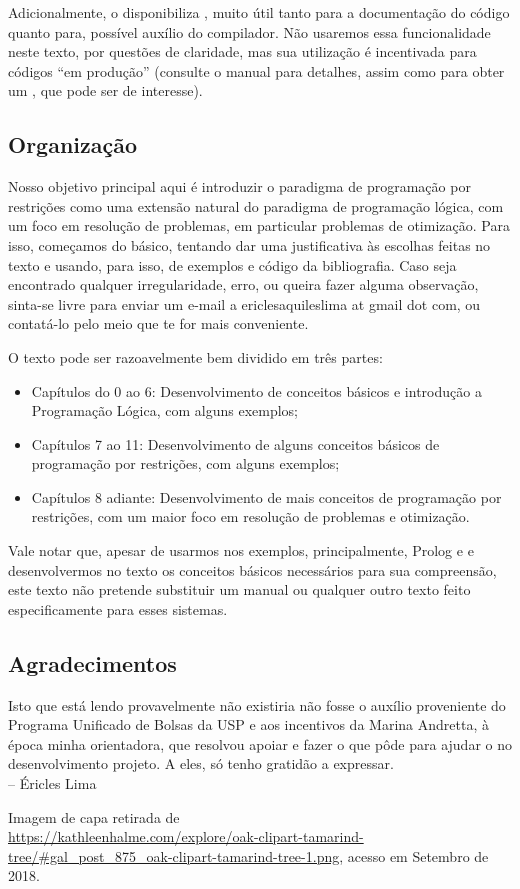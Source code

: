 Adicionalmente, o \eclipse disponibiliza , muito
útil tanto para a documentação do código quanto para, possível auxílio
do compilador. Não usaremos essa funcionalidade neste texto, por
questões de claridade, mas sua utilização é incentivada para códigos
``em produção'' (consulte o manual para detalhes, assim como para
obter um , que pode ser de interesse).


\subsection*{Organização}

Nosso objetivo principal aqui é introduzir o paradigma de programação
por restrições como uma extensão natural do paradigma de programação
lógica, com um foco em resolução de problemas, em particular problemas
de otimização. Para isso, começamos do básico, tentando dar uma
justificativa às escolhas feitas no texto e usando, para isso, de
exemplos e código da bibliografia. Caso seja encontrado qualquer
irregularidade, erro, ou queira fazer alguma observação, sinta-se
livre para enviar um e-mail a ericlesaquileslima at gmail dot com, ou
contatá-lo pelo meio que te for mais conveniente.

O texto pode ser razoavelmente bem dividido em três partes:
\begin{itemize}
\item Capítulos do 0 ao 6: Desenvolvimento de conceitos básicos e
  introdução a Programação Lógica, com alguns exemplos;
\item Capítulos 7 ao 11: Desenvolvimento de alguns conceitos básicos
  de programação por restrições, com alguns exemplos;
\item Capítulos 8 adiante: Desenvolvimento de mais conceitos de
  programação por restrições, com um maior foco em resolução de
  problemas e otimização.
\end{itemize}

Vale notar que, apesar de usarmos nos exemplos, principalmente, Prolog
e \eclipse e desenvolvermos no texto os conceitos básicos necessários
para sua compreensão, este texto não pretende substituir um manual ou
qualquer outro texto feito especificamente para esses sistemas.

\subsection*{Agradecimentos}

Isto que está lendo provavelmente não existiria não fosse o auxílio
proveniente do Programa Unificado de Bolsas da USP e aos incentivos
da Marina Andretta, à época minha orientadora, que resolvou apoiar e
fazer o que pôde para ajudar o no desenvolvimento projeto. A eles, só
tenho gratidão a expressar.\\
-- Éricles Lima

Imagem de capa retirada de\\
\url{https://kathleenhalme.com/explore/oak-clipart-tamarind-tree/#gal_post_875_oak-clipart-tamarind-tree-1.png}, acesso em Setembro de 2018.

%
